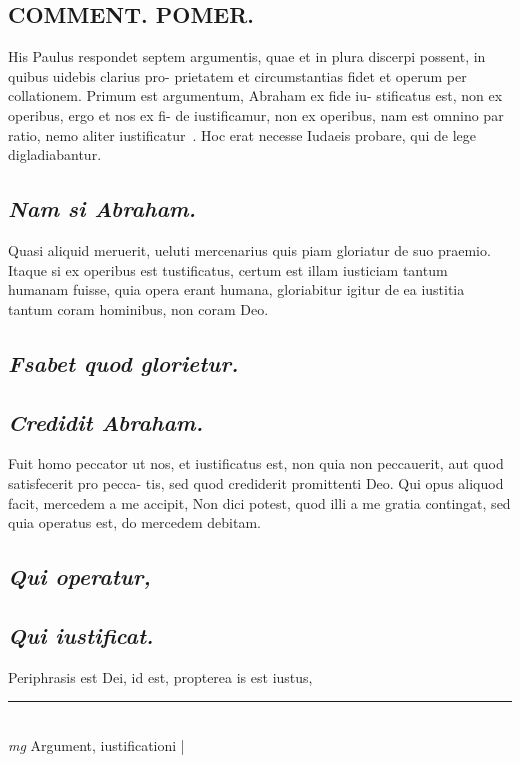 \documentclass{article}
\begin{document}
\begin{pages}
\section*{COMMENT. POMER.  }\pstart His Paulus respondet septem argumentis, quae et in plura discerpi possent, in quibus uidebis clarius pro- prietatem et circumstantias fidet et operum per collationem.  \pend\pstart Primum est argumentum, Abraham ex fide iu- stificatus est, non ex operibus, ergo et nos ex fi- de iustificamur, non ex operibus, nam est omnino par ratio, nemo aliter iustificatur . Hoc erat necesse Iudaeis probare, qui de lege digladiabantur.  \pend
{}
{}
\subsection*{\textit{Nam si Abraham. }}\pstart Quasi aliquid meruerit, ueluti mercenarius quis piam gloriatur de suo praemio. Itaque si ex operibus est tustificatus, certum est illam iusticiam tantum humanam fuisse, quia opera erant humana, gloriabitur igitur de ea iustitia tantum coram hominibus, non coram Deo.   \pend
{}
{}
\subsection*{\textit{Fsabet quod glorietur. }}
{}
\subsection*{\textit{Credidit Abraham. }}\pstart Fuit homo peccator ut nos, et iustificatus est, non quia non peccauerit, aut quod satisfecerit pro pecca- tis, sed quod crediderit promittenti Deo.   \pend\pstart Qui opus aliquod facit, mercedem a me accipit, Non dici potest, quod illi a me gratia contingat, sed quia operatus est, do mercedem debitam.   \pend
{}
{}
\subsection*{\textit{Qui operatur, }}
{}
\subsection*{\textit{Qui iustificat. }}\pstart Periphrasis est Dei, id est, propterea is est iustus,  \pend
\vspace{0.5cm}\noindent
\vspace{0.2cm}\rule{1cm}{0.2pt}\\ 
\hspace{0.2cm}\textit{mg}
\footnotesize Argument, iustificationi 
\normalsize| 

\end{pages}
\end{document}
